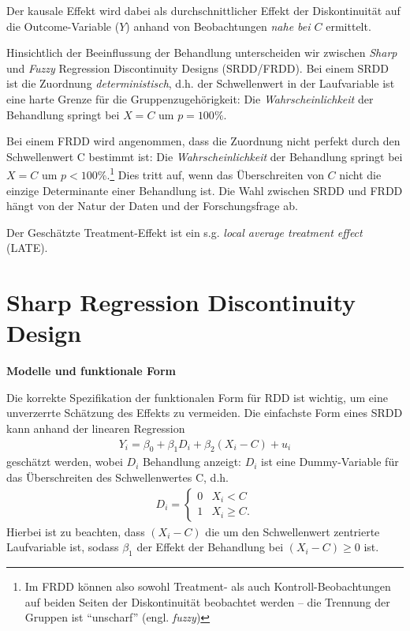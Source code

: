 \documentclass[
  letterpaper,
  DIV=11,
  oneside]{scrreprt}
\begin{document}
Der kausale Effekt wird dabei als durchschnittlicher Effekt der
Diskontinuität auf die Outcome-Variable (\(Y\)) anhand von Beobachtungen
\emph{nahe bei \(C\)} ermittelt.

Hinsichtlich der Beeinflussung der Behandlung unterscheiden wir zwischen
\emph{Sharp} und \emph{Fuzzy} Regression Discontinuity Designs
(SRDD/FRDD). Bei einem SRDD ist die Zuordnung \emph{deterministisch},
d.h. der Schwellenwert in der Laufvariable ist eine harte Grenze für die
Gruppenzugehörigkeit: Die \emph{Wahrscheinlichkeit} der Behandlung
springt bei \(X=C\) um \(p=100\%\).

Bei einem FRDD wird angenommen, dass die Zuordnung nicht perfekt durch
den Schwellenwert C bestimmt ist: Die \emph{Wahrscheinlichkeit} der
Behandlung springt bei \(X=C\) um \(p<100\%\).\footnote{Im FRDD können
  also sowohl Treatment- als auch Kontroll-Beobachtungen auf beiden
  Seiten der Diskontinuität beobachtet werden -- die Trennung der
  Gruppen ist ``unscharf'' (engl. \emph{fuzzy})} Dies tritt auf, wenn
das Überschreiten von \(C\) nicht die einzige Determinante einer
Behandlung ist. Die Wahl zwischen SRDD und FRDD hängt von der Natur der
Daten und der Forschungsfrage ab.

Der Geschätzte Treatment-Effekt ist ein s.g. \emph{local average
treatment effect} (LATE).

\hypertarget{sharp-regression-discontinuity-design}{%
\section{Sharp Regression Discontinuity
Design}\label{sharp-regression-discontinuity-design}}

\textbf{Modelle und funktionale Form}

Die korrekte Spezifikation der funktionalen Form für RDD ist wichtig, um
eine unverzerrte Schätzung des Effekts zu vermeiden. Die einfachste Form
eines SRDD kann anhand der linearen Regression \begin{align}
Y_i = \beta_0 + \beta_1 D_i + \beta_2 (X_i - C) + u_i\label{eq-simpleSRDD}
\end{align} geschätzt werden, wobei \(D_i\) Behandlung anzeigt: \(D_i\)
ist eine Dummy-Variable für das Überschreiten des Schwellenwertes C,
d.h. \begin{align*}
  D_i=\begin{cases}
    0 & X_i < C\\
    1 & X_i \geq C.
  \end{cases}
\end{align*} Hierbei ist zu beachten, dass \((X_i - C)\) die um den
Schwellenwert zentrierte Laufvariable ist, sodass \(\beta_1\) der Effekt
der Behandlung bei \((X_i - C)\geq 0\) ist.
\end{document}
